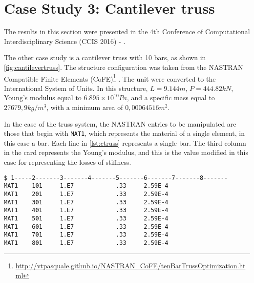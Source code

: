 \section{Case Study 3: Cantilever truss}
\label{sec:cantilevertruss}

The results in this section were presented in the 4th Conference of Computational Interdisciplinary Science (CCIS 2016) - \cite{hernandez2016ccis}.

The other case study is a cantilever truss \cite{VENKAYYA1971265} with 10 bars, as shown in \autoref{fig:cantilevertruss}. The structure configuration was taken from the NASTRAN Compatible Finite Elements (CoFE)\footnote{\scriptsize\url{http://vtpasquale.github.io/NASTRAN_CoFE/tenBarTrussOptimization.html}} \cite{ricciardi2015nonlinear}. The unit were converted to the International System of Units. In this structure, $L = 9.144 m$, $P = 444.82kN$, Young's modulus equal to $6.895 \times 10^{10} Pa$, and a specific mass equal to $27679,9 kg/m^3$, with a minimum area of $0,00064516m^2$.


In the case of the truss system, the NASTRAN entries to be manipulated are those that begin with \texttt{MAT1}, which represents the material of a single element, in this case a bar. Each line in \autoref{lst:ctruss} represents a single bar. The third column in the card represents the Young’s modulus, and this is the value modified in this case for representing the losses of stiffness.

\begin{lstlisting}[caption={NASTRAN input file for Cantilever Truss},label={lst:ctruss}]
$ 1-----2-------3-------4-------5-------6-------7-------8-------
MAT1    101     1.E7            .33     2.59E-4
MAT1    201     1.E7            .33     2.59E-4
MAT1    301     1.E7            .33     2.59E-4
MAT1    401     1.E7            .33     2.59E-4
MAT1    501     1.E7            .33     2.59E-4
MAT1    601     1.E7            .33     2.59E-4
MAT1    701     1.E7            .33     2.59E-4
MAT1    801     1.E7            .33     2.59E-4
\end{lstlisting}


